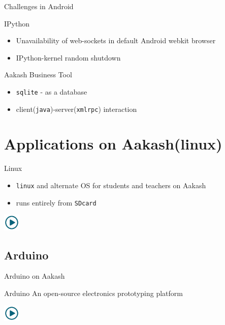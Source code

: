 \documentclass{beamer}
\begin{document}
  \begin{frame}{Challenges in Android}
    \begin{block}{IPython}
      \begin{itemize}
        \item Unavailability of web-sockets in default Android webkit
          browser
        \item IPython-kernel random shutdown
      \end{itemize}
    \end{block}
    \begin{block}{Aakash Business Tool}
      \begin{itemize}
        \item {\tt sqlite} - as a database 
        \item client({\tt java})-server({\tt xmlrpc}) interaction
      \end{itemize}
    \end{block}
  \end{frame}
\section{Applications on Aakash(linux)}
\begin{frame}{Linux}
  \begin{block}{}
    \begin{itemize}
    \item {\tt linux} and alternate OS for students and teachers on
      Aakash
    \item runs entirely from {\tt SDcard}
    \end{itemize}
  \end{block}
  \centerline{\href{file:///opt/techfest2013/linux.3gp}{\includegraphics[height=0.8cm,width=0.8cm]{play.jpg}}}
\end{frame}

\subsection{Arduino}
\begin{frame}{Arduino on Aakash}
  \begin{block}{Arduino}
    An open-source electronics prototyping platform
  \end{block}
  \centerline{\href{file:///opt/techfest2013/arduino.3gp}{\includegraphics[height=0.8cm,width=0.8cm]{play.jpg}}}
\end{frame}
\end{document}

